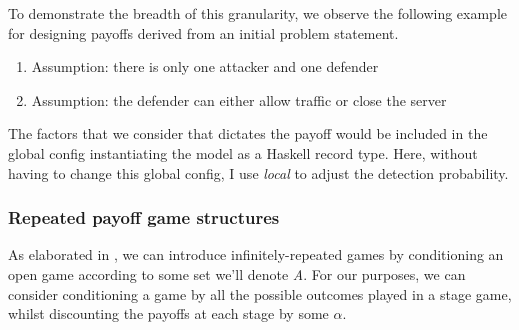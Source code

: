 To demonstrate the breadth of this granularity, we observe the following example for designing payoffs derived from an initial problem statement.

\begin{enumerate}
	\item Assumption: there is only one attacker and one defender
	\item Assumption: the defender can either allow traffic or close the server 
\end{enumerate}

The factors that we consider that dictates the payoff would be included in the global config instantiating the model as a Haskell record type. Here, without having to change this global config, I use \textit{local} to adjust the detection probability. 


\subsubsection{Repeated payoff game structures}
As elaborated in \cite{Hedges2019}, we can introduce infinitely-repeated games by conditioning an open game according to some set we'll denote \textit{A}. For our purposes, we can consider conditioning a game by all the possible outcomes played in a stage game, whilst discounting the payoffs at each stage by some $\alpha$. 

